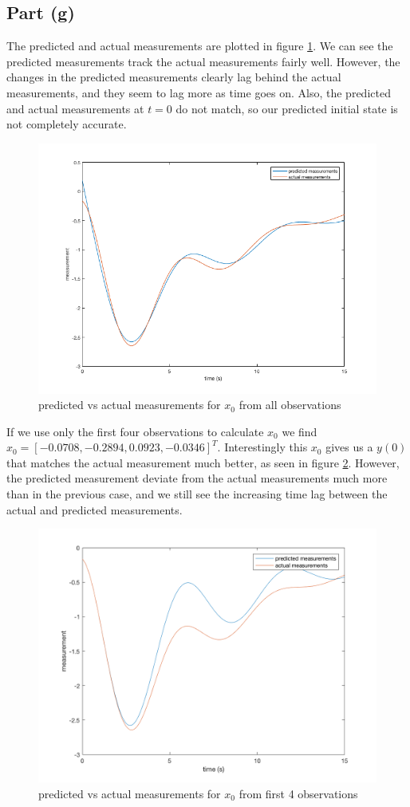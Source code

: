 \documentclass[11pt]{article}
\begin{document}
\subsection*{Part (g)}
The predicted and actual measurements are plotted in figure \ref{1g_plot1}. We can see the predicted measurements track the actual measurements fairly well. However, the changes in the predicted measurements clearly lag behind the actual measurements, and they seem to lag more as time goes on. Also, the predicted and actual measurements at $t=0$ do not match, so our predicted initial state is not completely accurate.
\begin{figure}[h!]
	\centering
	\includegraphics[width=0.6\linewidth]{1g_plot1.png}
	\caption{predicted vs actual measurements for $x_0$ from all observations}
	\label{1g_plot1}
\end{figure}

If we use only the first four observations to calculate $x_0$ we find $x_0=[-0.0708,-0.2894,0.0923,-0.0346]^T$. Interestingly this $x_0$ gives us a $y(0)$ that matches the actual measurement much better, as seen in figure \ref{1g_plot2}. However, the predicted measurement deviate from the actual measurements much more than in the previous case, and we still see the increasing time lag between the actual and predicted measurements.
\begin{figure}[h!]
	\centering
	\includegraphics[width=0.6\linewidth]{1g_plot2.png}
	\caption{predicted vs actual measurements for $x_0$ from first 4 observations}
	\label{1g_plot2}
\end{figure}
\end{document}
